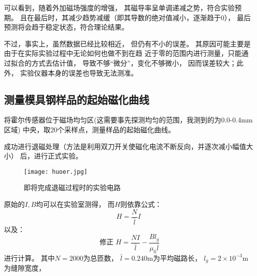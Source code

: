 \documentclass[11pt]{article}
\begin{document}
可以看到，随着外加磁场强度的增强，
其磁导率呈单调递减之势，符合实验预期。
且在最后时，其减少趋势减缓（即其导数的绝对值减小，逐渐趋于0），
最后预测将会趋于稳定状态，符合理论结果。

不过，事实上，虽然数据已经比较相近，
但仍有不小的误差。
其原因可能主要是由于在实际实验过程中无论如何也做不到在趋
近于零的范围内进行测量，只能通过拟合的方式去估计值，
导致不够“微分”，变化不够微小，
因而误差较大；此外，
实验仪器本身的误差也导致无法测准。








\subsection{测量模具钢样品的起始磁化曲线}

将霍尔传感器位于磁场均匀区(这需要事先探测均匀的范围，我测到的为0.0-0.4mm区域)
中央，取20个采样点，测量样品的起始磁化曲线。

成功进行退磁处理（方法是利用双刀开关使磁化电流不断反向，并逐次减小幅值大小）
后，进行正式实验。

\begin{figure}[H]
    \centering
    \texttt{[image: huoer.jpg]}
    \caption{即将完成退磁过程时的实验电路}
\end{figure}



原始的$I,B$均可以在实验室测得，
而$H$则依靠公式：\begin{displaymath}H=\frac{N}{\bar{l}}I\end{displaymath}
以及：\begin{displaymath}\text{ 修正 } H=\frac{NI}{\bar{l}}-\frac{Bl_g}{\mu_0{\overline l}}\end{displaymath}进行计算。
其中$N=2000$为总匝数，
$\bar{l}=0.240\text{m}$为平均磁路长，
$l_g=2\times 10^{-3}\text{m}$为缝隙宽度，
\end{document}
